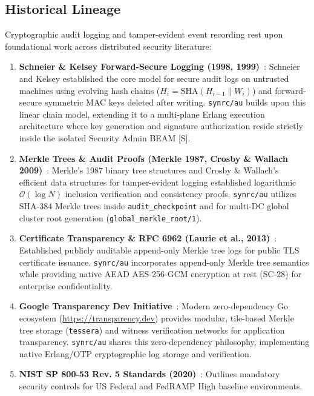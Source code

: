 \documentclass{article}
\begin{document}
\subsection{Historical Lineage}
Cryptographic audit logging and tamper-evident event recording rest upon foundational work across distributed security literature:
\begin{enumerate}
    \item \textbf{Schneier \& Kelsey Forward-Secure Logging (1998, 1999)}~\cite{schneier1998,schneier1999}: Schneier and Kelsey established the core model for secure audit logs on untrusted machines using evolving hash chains ($H_i = \text{SHA}(H_{i-1} \parallel W_i)$) and forward-secure symmetric MAC keys deleted after writing. \texttt{synrc/au} builds upon this linear chain model, extending it to a multi-plane Erlang execution architecture where key generation and signature authorization reside strictly inside the isolated Security Admin BEAM [S].
    \item \textbf{Merkle Trees \& Audit Proofs (Merkle 1987, Crosby \& Wallach 2009)}~\cite{merkle1987,crosby2009}: Merkle's 1987 binary tree structures and Crosby \& Wallach's efficient data structures for tamper-evident logging established logarithmic $\mathcal{O}(\log N)$ inclusion verification and consistency proofs. \texttt{synrc/au} utilizes SHA-384 Merkle trees inside \texttt{audit\_checkpoint} and for multi-DC global cluster root generation (\texttt{global\_merkle\_root/1}).
    \item \textbf{Certificate Transparency \& RFC 6962 (Laurie et al., 2013)}~\cite{rfc6962}: Established publicly auditable append-only Merkle tree logs for public TLS certificate issuance. \texttt{synrc/au} incorporates append-only Merkle tree semantics while providing native AEAD AES-256-GCM encryption at rest (SC-28) for enterprise confidentiality.
    \item \textbf{Google Transparency Dev Initiative}~\cite{transparencydev}: Modern zero-dependency Go ecosystem (\url{https://transparency.dev}) provides modular, tile-based Merkle tree storage (\texttt{tessera}) and witness verification networks for application transparency. \texttt{synrc/au} shares this zero-dependency philosophy, implementing native Erlang/OTP cryptographic log storage and verification.
    \item \textbf{NIST SP 800-53 Rev. 5 Standards (2020)}~\cite{nist80053}: Outlines mandatory security controls for US Federal and FedRAMP High baseline environments.
\end{enumerate}
\end{document}
